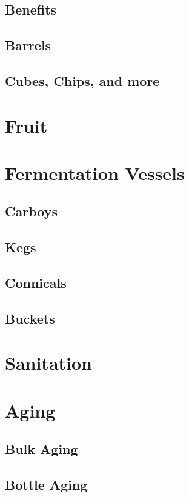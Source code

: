 \documentclass{article}
\begin{document}
{ \subsection{Benefits}
 \subsection{Barrels}
 \subsection{Cubes, Chips, and more}

\section{Fruit}

\section{Fermentation Vessels}
 \subsection{Carboys}
 \subsection{Kegs}
 \subsection{Connicals}
 \subsection{Buckets}

\section{Sanitation}

\section{Aging}
 \subsection{Bulk Aging}
 \subsection{Bottle Aging}



}
\end{document}
